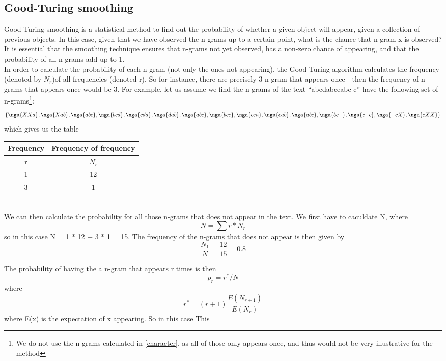 \subsection{Good-Turing smoothing}
\label{Good-Turing}
Good-Turing smoothing is a statistical method to find out the probability of whether a given object will appear, given a collection of previous objects. In this case, given that we have observed the n-grams up to a certain point, what is the chance that n-gram x is observed? It is essential that the smoothing technique ensures that n-grams not yet observed, has a non-zero chance of appearing, and that the probability of all n-grams add up to 1.\\

In order to calculate the probability of each n-gram (not only the ones not appearing), the Good-Turing algorithm calculates the frequency (denoted by $N_r$)of all frequencies (denoted r). So for instance, there are precisely 3 n-gram that appears once - then the frequency of n-grams that appears once would be 3. For example, let us assume we find the n-grams of the text ``abcdabceabc c'' have the following set of n-grams\footnote{We do not use the n-grams calculated in \ref{character}, as all of those only appears once, and thus would not be very illustrative for the method}:\\
$$
\{\nga{XXa}, \nga{Xab}, \nga{abc}, \nga{bcd}, \nga{cda}, \nga{dab}, \nga{abc}, \nga{bce}, \nga{cea}, \nga{eab}, \nga{abc}, \nga{bc\_}, \nga{c\_c}, \nga{\_cX}, \nga{cXX} \}
$$
which gives us the table\\
\begin{tabular}{|cc|}
\hline
Frequency & Frequency of frequency \\
\hline
r & $N_{r}$ \\
1 & 12\\
3 & 1\\
\hline
\end{tabular}
\\
We can then calculate the probability for all those n-grams that does not appear in the text. We first have to caculdate N, where 
$$
N = \sum r * N_r
$$
so in this case N = 1 * 12 + 3 * 1 = 15. The frequency of the n-grams that does not appear is then given by 
$$
\frac{N_1}{N} = \frac{12}{15} = 0.8
$$

The probability of having the a n-gram that appears r times is then 
$$p_r = r^*/N$$
 where 
$$r^* = (r+1)\frac{E(N_{r+1})}{E(N_r)}$$
 where E(x) is the expectation of x appearing. So in this case This 

